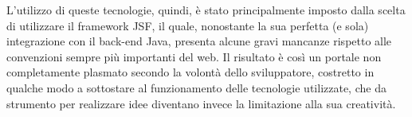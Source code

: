 L'utilizzo di queste tecnologie, quindi, è stato principalmente imposto dalla scelta di utilizzare il framework JSF, il quale, nonostante la sua perfetta (e sola) integrazione con il back-end Java, presenta alcune gravi mancanze rispetto alle convenzioni sempre più importanti del web. Il risultato è così un portale non completamente plasmato secondo la volontà dello sviluppatore, costretto in qualche modo a sottostare al funzionamento delle tecnologie utilizzate, che da strumento per realizzare idee diventano invece la limitazione alla sua creatività.